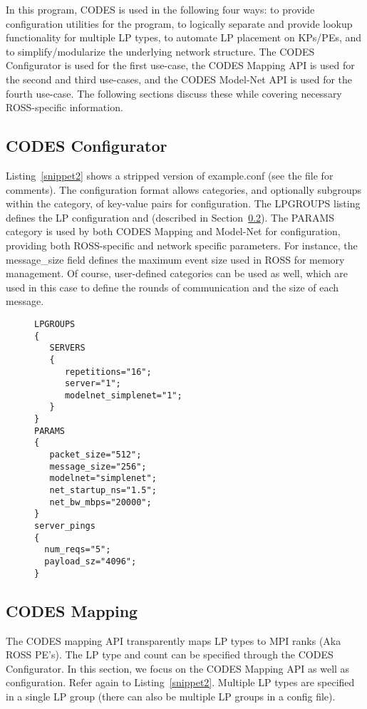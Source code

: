 \documentclass[conference,10pt,compsocconf,onecolumn]{IEEEtran}
\begin{document}
In this program, CODES is used in the following four ways: to provide
configuration utilities for the program, to logically separate and provide
lookup functionality for multiple LP types, to automate LP placement on KPs/PEs,
and to simplify/modularize the underlying network structure. The CODES
Configurator is used for the first use-case, the CODES Mapping API is used for
the second and third use-cases, and the CODES Model-Net API is used for the
fourth use-case. The following sections discuss these while covering necessary
ROSS-specific information.

\subsection{CODES Configurator}

Listing~\ref{snippet2} shows a stripped version of example.conf (see the file
for comments). The configuration format allows categories, and optionally
subgroups within the category, of key-value pairs for configuration. The LPGROUPS
listing defines the LP configuration and (described in
Section~\ref{subsec:codes_mapping}). The PARAMS category is used by both
CODES Mapping and Model-Net for configuration, providing both ROSS-specific and
network specific parameters. For instance, the message\_size field defines the
maximum event size used in ROSS for memory management. Of course, user-defined
categories can be used as well, which are used in this case to define the rounds
of communication and the size of each message.

\begin{figure}
\begin{lstlisting}[caption=example configuration file for CODES LP mapping, label=snippet2]
LPGROUPS
{
   SERVERS
   {
      repetitions="16";
      server="1";
      modelnet_simplenet="1";
   }
}
PARAMS
{
   packet_size="512";
   message_size="256";
   modelnet="simplenet";
   net_startup_ns="1.5";
   net_bw_mbps="20000";
}
server_pings
{
  num_reqs="5";
  payload_sz="4096";
} 
\end{lstlisting}
\end{figure} 


\subsection{CODES Mapping}
\label{subsec:codes_mapping}

The CODES mapping API transparently maps LP types to MPI ranks (Aka ROSS PE's).
The LP type and count can be specified through the CODES Configurator. In this
section, we focus on the CODES Mapping API as well as configuration. Refer again
to Listing~\ref{snippet2}. Multiple LP types are specified in a single LP group
(there can also be multiple LP groups in a config file).
\end{document}
